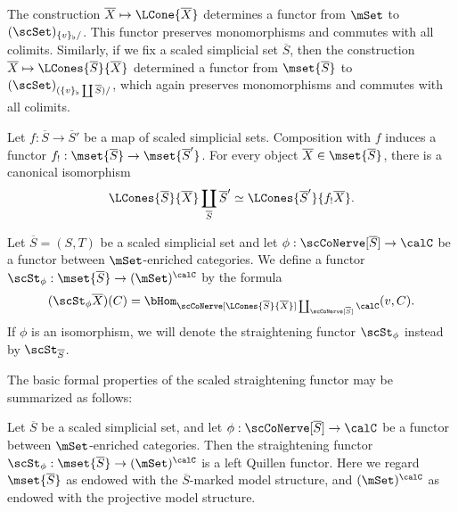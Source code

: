 \begin{remark}\label{swite}
The construction $\overline{X} \mapsto \LCone{\overline{X}}$ determines a functor
from $\mSet$ to $(\scSet)_{ \{v\}_{\flat} / }$. This functor preserves monomorphisms and commutes with all colimits. Similarly, if we fix a scaled simplicial set $\overline{S}$, then the construction
$\overline{X} \mapsto \LCones{\overline{S}}{\overline{X}}$ determined a functor from
$\mset{\overline{S}}$ to $(\scSet)_{ (\{v\}_{\flat} \coprod \overline{S})/}$, which again preserves monomorphisms and commutes with all colimits.
\end{remark}

\begin{remark}\label{sagee}
Let $f: \overline{S} \rightarrow \overline{S}'$ be a map of scaled simplicial sets. Composition with
$f$ induces a functor $f_!: \mset{\overline{S}} \rightarrow \mset{ \overline{S}' }$. For every
object $\overline{X} \in \mset{\overline{S}}$, there is a canonical isomorphism
$$ \LCones{\overline{S}}{\overline{X}} \coprod_{ \overline{S} } \overline{S}'
\simeq \LCones{ \overline{S}' }{f_! \overline{X} }.$$
\end{remark}


\begin{definition}\label{sputer2}
Let $\overline{S} = (S,T)$ be a scaled simplicial set and let $\phi: \scCoNerve[ \overline{S} ] \rightarrow \calC$ be a functor between $\mSet$-enriched categories. We define a functor
$\scSt_{\phi}: \mset{ \overline{S} } \rightarrow (\mSet)^{\calC}$ by the formula
$$(\scSt_{\phi} \overline{X})(C) = \bHom_{ \scCoNerve[ \LCones{\overline{S}}{\overline{X}}]
\coprod_{ \scCoNerve[ \overline{S} ] } \calC }(v, C).$$
If $\phi$ is an isomorphism, we will denote the straightening functor
$\scSt_{\phi}$ instead by $\scSt_{\overline{S}}$. 
\end{definition}

The basic formal properties of the scaled straightening functor may be summarized as follows:

\begin{proposition}\label{curp}
Let $\overline{S}$ be a scaled simplicial set, and let $\phi: \scCoNerve[ \overline{S} ] \rightarrow \calC$
be a functor between $\mSet$-enriched categories. Then the straightening functor
$\scSt_{\phi}: \mset{ \overline{S} } \rightarrow (\mSet)^{\calC}$ is a left Quillen functor. Here we
regard $\mset{ \overline{S} }$ as endowed with the $\overline{S}$-marked model structure, and
$(\mSet)^{\calC}$ as endowed with the projective model structure.
\end{proposition}

